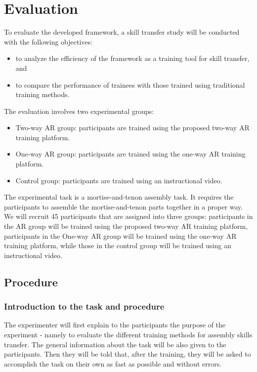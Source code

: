 \chapter{Evaluation}
\label{chap:e}

To evaluate the developed framework, a skill transfer study will be conducted with the following objectives:

\begin{itemize}
	\item
	to analyze the efficiency of the framework as a training tool for skill transfer, and
	\item
	to compare the performance of trainees with those trained using traditional training methods.
\end{itemize}

The evaluation involves two experimental groups:

\begin{itemize}
	\item
	Two-way AR group: participants are trained using the proposed two-way AR training platform.
	\item
	One-way AR group: participants are trained using the one-way AR training platform.
	\item
	Control group: participants are trained using an instructional video.
\end{itemize}

The experimental task is a mortise-and-tenon assembly task. It requires the participants to assemble the mortise-and-tenon parts together in a proper way. We will recruit 45 participants that are assigned into three groups: participants in the AR group will be trained using the proposed two-way AR training platform, participants in the One-way AR group will be trained using the one-way AR training platform, while those in the control group will be trained using an instructional video.

\section{Procedure}

\subsection{Introduction to the task and procedure}

The experimenter will first explain to the participants the purpose of the experiment - namely to evaluate the different training methods for assembly skills transfer.
The general information about the task will be also given to the participants.
Then they will be told that, after the training, they will be asked to accomplish the task on their own as fast as possible and without errors.

